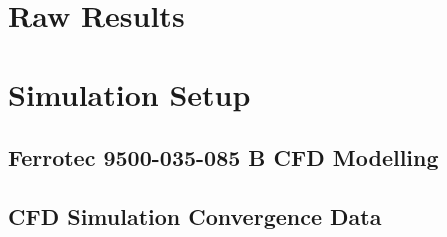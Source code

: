 \appendix
\chapter{Raw Results}
\label{cha:appendix}

\chapter{Simulation Setup}

\section{Ferrotec 9500-035-085 B CFD Modelling}
\label{cha:app_TEC_CFD}

\section{CFD Simulation Convergence Data}
\label{cha:CFDconverg}

%

